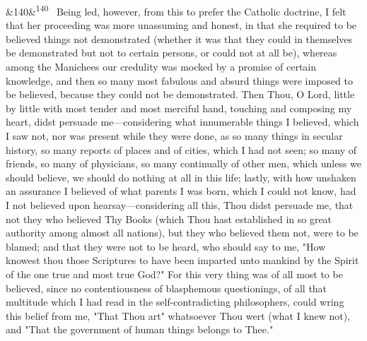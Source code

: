 \documentclass[12pt]{article}
\newcommand{\para}[1][]{\par\noindent\ifx&#1&\else\textsuperscript{\footnotesize #1}~\fi}
\begin{document}
\para[140] Being led, however, from this to prefer the Catholic doctrine, I felt that her proceeding was more unassuming and honest, in that she required to be believed things not demonstrated (whether it was that they could in themselves be demonstrated but not to certain persons, or could not at all be), whereas among the Manichees our credulity was mocked by a promise of certain knowledge, and then so many most fabulous and absurd things were imposed to be believed, because they could not be demonstrated. Then Thou, O Lord, little by little with most tender and most merciful hand, touching and composing my heart, didst persuade me---considering what innumerable things I believed, which I saw not, nor was present while they were done, as so many things in secular history, so many reports of places and of cities, which I had not seen; so many of friends, so many of physicians, so many continually of other men, which unless we should believe, we should do nothing at all in this life; lastly, with how unshaken an assurance I believed of what parents I was born, which I could not know, had I not believed upon hearsay---considering all this, Thou didst persuade me, that not they who believed Thy Books (which Thou hast established in so great authority among almost all nations), but they who believed them not, were to be blamed; and that they were not to be heard, who should say to me, "How knowest thou those Scriptures to have been imparted unto mankind by the Spirit of the one true and most true God?" For this very thing was of all most to be believed, since no contentiousness of blasphemous questionings, of all that multitude which I had read in the self-contradicting philosophers, could wring this belief from me, "That Thou art" whatsoever Thou wert (what I knew not), and "That the government of human things belongs to Thee."
\end{document}
